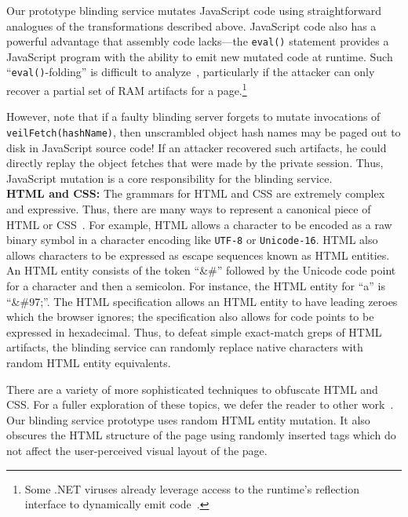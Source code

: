 Our prototype blinding service mutates JavaScript code
using straightforward analogues of the transformations
described above. JavaScript code also has
a powerful advantage that assembly code
lacks---the \texttt{eval()} statement provides a
JavaScript program with the ability to emit new
mutated code at runtime. Such ``\texttt{eval()}-folding''
is difficult to analyze~\cite{zozzle}, particularly
if the attacker can only recover a partial set of
RAM artifacts for a page.\footnote{Some .NET viruses
	already leverage access to the runtime's reflection
	interface to dynamically emit code~\cite{szor05}.}

However, note that if a faulty blinding server forgets to mutate invocations
of \texttt{veilFetch(hashName)}, then unscrambled object
hash names may be paged out to disk in JavaScript source code! If an attacker
recovered such artifacts, he could directly replay the
object fetches that were made by the private session.
Thus, JavaScript mutation is a core responsibility for
the blinding service.\\

\noindent
{\bf HTML and CSS:} The grammars for HTML and CSS are
extremely complex and expressive. Thus, there are many
ways to represent a canonical piece of HTML or
CSS~\cite{webAppObfuscation}. For example, HTML allows %
a character to be encoded as a raw binary symbol in a
character encoding like \texttt{UTF-8} or \texttt{Unicode-16}.
HTML also allows characters to be expressed as escape
sequences known as HTML entities. An HTML entity consists
of the token ``\&\#'' followed by the Unicode code point
for a character and then a semicolon. For instance, the
HTML entity for ``a'' is ``\&\#97;''. The HTML
specification allows an HTML entity to have leading
zeroes which the browser ignores; the specification
also allows for code points to be expressed in
hexadecimal. Thus, to defeat simple exact-match
greps of HTML artifacts, the blinding service
can randomly replace native characters with random
HTML entity equivalents.

There are a variety of more sophisticated techniques
to obfuscate HTML and CSS. For a fuller exploration
of these topics, we defer the reader to other
work~\cite{webAppObfuscation}. Our blinding service
prototype uses random HTML entity mutation. It also
obscures the HTML structure of the page using
randomly inserted tags which do not affect the
user-perceived visual layout of the page.\\

